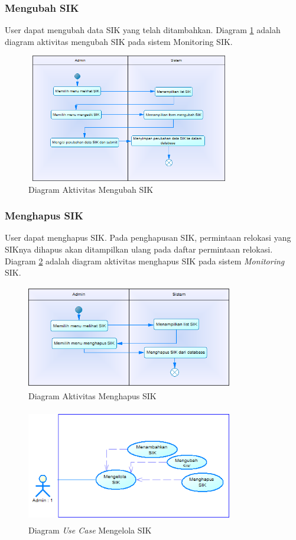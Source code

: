 	\subsubsection{Mengubah SIK}
	User dapat mengubah data SIK yang telah ditambahkan. Diagram \ref{figure:activity_mengubah_sik} adalah diagram aktivitas mengubah SIK pada sistem Monitoring SIK.
	\begin{figure}[h]
	\centerline {\includegraphics[width=9cm,height=5.6cm]{bab4/ActivityDiagram_MengubahSIK.png}}
	\caption{Diagram Aktivitas Mengubah SIK}
	\label{figure:activity_mengubah_sik}
	\end{figure}

	\subsubsection{Menghapus SIK}
	User dapat menghapus SIK. Pada penghapusan SIK, permintaan relokasi yang SIKnya dihapus akan ditampilkan ulang pada daftar permintaan relokasi. Diagram \ref{figure:activity_menghapus_sik} adalah diagram aktivitas menghapus SIK pada sistem \textit{Monitoring } SIK.
	\begin{figure}[h]
	\centerline {\includegraphics[width=9cm,height=4.5cm]{bab4/ActivityDiagram_MenghapusSIK.png}}
	\caption{Diagram Aktivitas Menghapus SIK}
	\label{figure:activity_menghapus_sik}
	\end{figure}		

	\begin{figure}[h]
	\centerline {\includegraphics[width=9cm,height=5cm]{bab4/use-case-mengelola-sik.png}}
	\caption{Diagram \textit{Use Case} Mengelola SIK}
	\label{figure:use_case_mengelola_sik}
	\end{figure}

